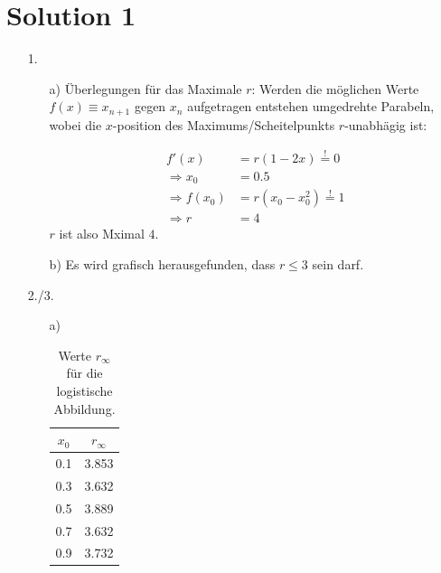 
\section{Solution 1}
\label{sec:auswertung}

\begin{itemize}
    \item[1.]
    \begin{itemize}
        Zum Warmlaufen wird die Abbildung $N=30$ mal durchiteriert. Die Zahl wird relativ willkürlich gewählt, solle aber nicht zu niedrig sein.

        \item[a)]
        Überlegungen für das Maximale $r$:
        Werden die möglichen Werte $f(x)\equiv x_{n+1}$ gegen $x_n$ aufgetragen entstehen umgedrehte Parabeln, wobei die $x$-position des Maximums/Scheitelpunkts $r$-unabhägig ist:
        
        \begin{align}
            f'(x) & = r(1-2x) \overset{!}{=} 0 \\
            \Rightarrow x_0 & = 0.5 \\
            \Rightarrow f(x_0) & = r(x_0-x_0^2) \overset{!}{=} 1 \\
            \Rightarrow r & = 4
        \end{align}
        $r$ ist also Mximal $4$.

        \item[b)]
        Es wird grafisch herausgefunden, dass $r \leq 3$ sein darf.
    \end{itemize}
    \item[2./3.]
    \begin{itemize}
        $r$ wird systematisch in Schritten $\Delta r = 0.001$ vatiiert. Jeder $r$- Wert erzeugt jeweilige Fixpunkte, welche dann in $r$-Abhängigkeit in ein Diagramm aufgetragen werden. 
        Es werden verschiedene Startwerte $x_0$ verwendet. 
        \item[a)]
        \begin{table}[h]
            \centering
            \caption{Werte $r_{\infty}$ für die logistische Abbildung.}
            \begin{tabular}{S S}
                \toprule
                {$x_0$} & {$r_{\infty}$} \\
                 & 3.853 \\
                0.3 & 3.632 \\
                0.5 & 3.889 \\
                0.7 & 3.632 \\
                0.9 & 3.732 \\
                

\end{tabular}
\end{table}
\end{itemize}
\end{itemize}

